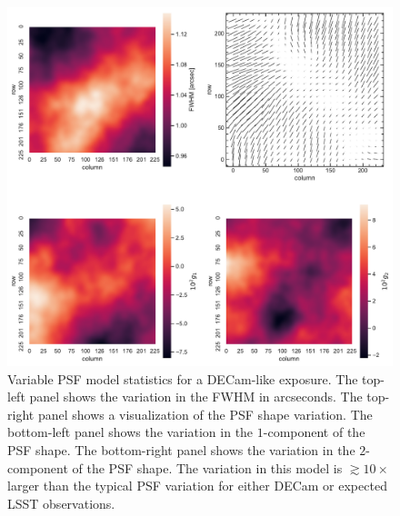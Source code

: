 \documentclass[fleqn,useAMS,usenatbib]{mnras}
\begin{document}
\begin{figure}
  \includegraphics[width=\textwidth]{figures/pspsf.pdf}
  \caption{
    Variable PSF model statistics for a DECam-like exposure. The top-left
    panel shows the variation in the FWHM in arcseconds. The top-right panel
    shows a visualization of the PSF shape variation. The bottom-left panel shows
    the variation in the $1$-component of the PSF shape. The bottom-right panel
    shows the variation in the $2$-component of the PSF shape. The variation in
    this model is $\gtrsim10\times$ larger than the typical PSF variation for
    either DECam or expected LSST observations.
    \label{fig:pspsf}}
\end{figure}
\end{document}

